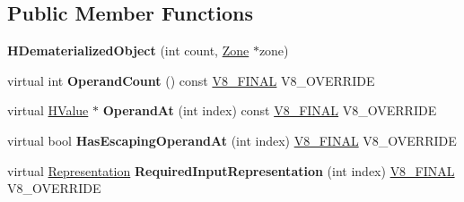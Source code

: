 \subsection*{Public Member Functions}
\begin{DoxyCompactItemize}
\item 
\hypertarget{classv8_1_1internal_1_1_h_dematerialized_object_a0d264866b1a482250547eb35a94d13ca}{}{\bfseries H\+Dematerialized\+Object} (int count, \hyperlink{classv8_1_1internal_1_1_zone}{Zone} $\ast$zone)\label{classv8_1_1internal_1_1_h_dematerialized_object_a0d264866b1a482250547eb35a94d13ca}

\item 
\hypertarget{classv8_1_1internal_1_1_h_dematerialized_object_a3e0d831fe08d3e3ef9680ad2befdf227}{}virtual int {\bfseries Operand\+Count} () const \hyperlink{classv8_1_1internal_1_1_v8___f_i_n_a_l}{V8\+\_\+\+F\+I\+N\+A\+L} V8\+\_\+\+O\+V\+E\+R\+R\+I\+D\+E\label{classv8_1_1internal_1_1_h_dematerialized_object_a3e0d831fe08d3e3ef9680ad2befdf227}

\item 
\hypertarget{classv8_1_1internal_1_1_h_dematerialized_object_a0096a95b86d6a718b3d4cfb7e511ab7e}{}virtual \hyperlink{classv8_1_1internal_1_1_h_value}{H\+Value} $\ast$ {\bfseries Operand\+At} (int index) const \hyperlink{classv8_1_1internal_1_1_v8___f_i_n_a_l}{V8\+\_\+\+F\+I\+N\+A\+L} V8\+\_\+\+O\+V\+E\+R\+R\+I\+D\+E\label{classv8_1_1internal_1_1_h_dematerialized_object_a0096a95b86d6a718b3d4cfb7e511ab7e}

\item 
\hypertarget{classv8_1_1internal_1_1_h_dematerialized_object_aecc00bb3dc1cb30b95a18c63e685ce5c}{}virtual bool {\bfseries Has\+Escaping\+Operand\+At} (int index) \hyperlink{classv8_1_1internal_1_1_v8___f_i_n_a_l}{V8\+\_\+\+F\+I\+N\+A\+L} V8\+\_\+\+O\+V\+E\+R\+R\+I\+D\+E\label{classv8_1_1internal_1_1_h_dematerialized_object_aecc00bb3dc1cb30b95a18c63e685ce5c}

\item 
\hypertarget{classv8_1_1internal_1_1_h_dematerialized_object_a9fe9dbbe09b8ec0e054de98a74ed6111}{}virtual \hyperlink{classv8_1_1internal_1_1_representation}{Representation} {\bfseries Required\+Input\+Representation} (int index) \hyperlink{classv8_1_1internal_1_1_v8___f_i_n_a_l}{V8\+\_\+\+F\+I\+N\+A\+L} V8\+\_\+\+O\+V\+E\+R\+R\+I\+D\+E\label{classv8_1_1internal_1_1_h_dematerialized_object_a9fe9dbbe09b8ec0e054de98a74ed6111}

\end{DoxyCompactItemize}
